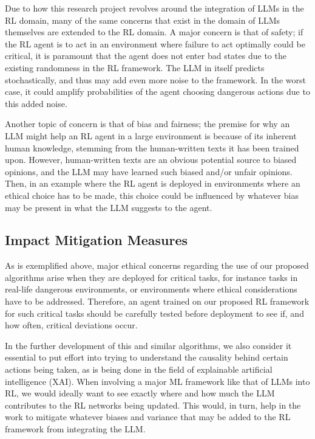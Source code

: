 \documentclass[conference]{IEEEtran}
\begin{document}
Due to how this research project revolves around the integration of LLMs in the RL domain, many of the same concerns that exist in the domain of LLMs themselves are extended to the RL domain. A major concern is that of safety; if the RL agent is to act in an environment where failure to act optimally could be critical, it is paramount that the agent does not enter bad states due to the existing randomness in the RL framework. The LLM in itself predicts stochastically, and thus may add even more noise to the framework. In the worst case, it could amplify probabilities of the agent choosing dangerous actions due to this added noise.

Another topic of concern is that of bias and fairness; the premise for why an LLM might help an RL agent in a large environment is because of its inherent human knowledge, stemming from the human-written texts it has been trained upon. However, human-written texts are an obvious potential source to biased opinions, and the LLM may have learned such biased and/or unfair opinions. Then, in an example where the RL agent is deployed in environments where an ethical choice has to be made, this choice could be influenced by whatever bias may be present in what the LLM suggests to the agent.

\subsection{Impact Mitigation Measures}

As is exemplified above, major ethical concerns regarding the use of our proposed algorithms arise when they are deployed for critical tasks, for instance tasks in real-life dangerous environments, or environments where ethical considerations have to be addressed. Therefore, an agent trained on our proposed RL framework for such critical tasks should be carefully tested before deployment to see if, and how often, critical deviations occur.

In the further development of this and similar algorithms, we also consider it essential to put effort into trying to understand the causality behind certain actions being taken, as is being done in the field of explainable artificial intelligence (XAI). When involving a major ML framework like that of LLMs into RL, we would ideally want to see exactly where and how much the LLM contributes to the RL networks being updated. This would, in turn, help in the work to mitigate whatever biases and variance that may be added to the RL framework from integrating the LLM.
\end{document}
